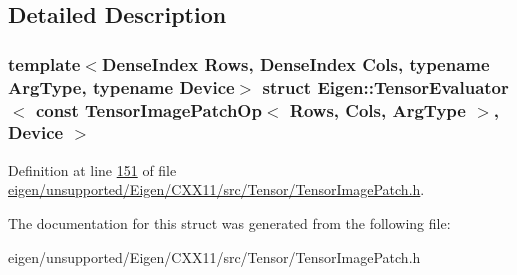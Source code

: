 \subsection{Detailed Description}
\subsubsection*{template$<$Dense\+Index Rows, Dense\+Index Cols, typename Arg\+Type, typename Device$>$\newline
struct Eigen\+::\+Tensor\+Evaluator$<$ const Tensor\+Image\+Patch\+Op$<$ Rows, Cols, Arg\+Type $>$, Device $>$}



Definition at line \hyperlink{eigen_2unsupported_2_eigen_2_c_x_x11_2src_2_tensor_2_tensor_image_patch_8h_source_l00151}{151} of file \hyperlink{eigen_2unsupported_2_eigen_2_c_x_x11_2src_2_tensor_2_tensor_image_patch_8h_source}{eigen/unsupported/\+Eigen/\+C\+X\+X11/src/\+Tensor/\+Tensor\+Image\+Patch.\+h}.



The documentation for this struct was generated from the following file\+:\begin{DoxyCompactItemize}
\item 
eigen/unsupported/\+Eigen/\+C\+X\+X11/src/\+Tensor/\+Tensor\+Image\+Patch.\+h\end{DoxyCompactItemize}
